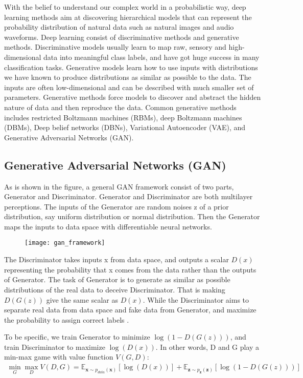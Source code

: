 With the belief to understand our complex world in a probabilistic way, deep learning methods aim at discovering hierarchical models that can represent the probability distribution of natural data such as natural images and audio waveforms. Deep learning consist of discriminative methods and generative methods. Discriminative models usually learn to map raw, sensory and high-dimensional data into meaningful class labels, and have got huge success in many classification tasks. Generative models learn how to use inputs with distributions we have known to produce distributions as similar as possible to the data. The inputs are often low-dimensional and can be described with much smaller set of parameters. Generative methods force models to discover and abstract the hidden nature of data and then reproduce the data. Common generative methods includes restricted Boltzmann machines (RBMs), deep Boltzmann machines (DBMs), Deep belief networks (DBNs), Variational Autoencoder (VAE), and Generative Adversarial Networks (GAN).

\subsection{Generative Adversarial Networks (GAN)}
As is shown in the figure, a general GAN framework consist of two parts, Generator and Discriminator. Generator and Discriminator are both multilayer perceptions. The inputs of the Generator are random noises z of a prior distribution, say uniform distribution or normal distribution. Then the Generator maps the inputs to data space with differentiable neural networks.
\begin{figure}
	\centering
	\texttt{[image: gan\_framework]}
	\label{fig:6}
\end{figure}
The Discriminator takes inputs x from data space, and outputs a scalar $D(x)$ representing the probability that x comes from the data rather than the outputs of Generator. The task of Generator is to generate as similar as possible distributions of the real data to deceive Discriminator. That is making $D(G(z))$ give the same scalar as $D(x)$. While the Discriminator aims to separate real data from data space and fake data from Generator, and maximize the probability to assign correct labels .

To be specific, we train Generator to minimize $\log(1-D(G(z)))$, and train Discriminator to maximize $\log(D(x))$. In other words, D and G play a min-max game with value function $V(G,D)$:
\begin{equation}
\begin{aligned}
\min \limits_{G} \max \limits_{D} V(D,G) = \mathbb{E}_{\textbf{x}\sim p_{data}(\textbf{x})}[\log(D(x))]+\mathbb{E}_{\textbf{z}\sim p_{\textbf{z}}(\textbf{z})}[\log(1-D(G(z)))]
\end{aligned}
\end{equation}

